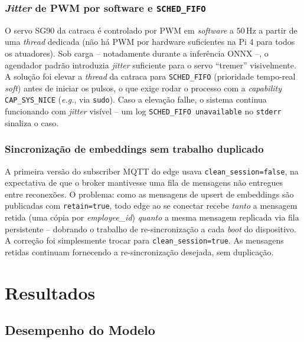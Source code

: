 \documentclass[12pt,a4paper]{report}
\begin{document}
\subsection{\textit{Jitter} de PWM por software e \texttt{SCHED\_FIFO}}

O servo SG90 da catraca é controlado por PWM em \textit{software} a
$50\,$Hz a partir de uma \textit{thread} dedicada (não há PWM por
hardware suficientes na Pi 4 para todos os atuadores). Sob carga --
notadamente durante a inferência ONNX --, o agendador padrão
introduzia \textit{jitter} suficiente para o servo ``tremer''
visivelmente. A solução foi elevar a \textit{thread} da catraca para
\texttt{SCHED\_FIFO} (prioridade tempo-real \textit{soft}) antes de
iniciar os pulsos, o que exige rodar o processo com a \textit{capability}
\texttt{CAP\_SYS\_NICE} (\textit{e.g.}, via \texttt{sudo}). Caso a
elevação falhe, o sistema continua funcionando com \textit{jitter}
visível -- um log \texttt{SCHED\_FIFO unavailable} no \texttt{stderr}
sinaliza o caso.

\subsection{Sincronização de embeddings sem trabalho duplicado}

A primeira versão do subscriber MQTT do edge usava
\texttt{clean\_session=false}, na expectativa de que o broker
mantivesse uma fila de mensagens não entregues entre reconexões. O
problema: como as mensagens de upsert de embeddings são publicadas
com \texttt{retain=true}, todo edge ao se conectar recebe \emph{tanto}
a mensagem retida (uma cópia por \textit{employee\_id}) \emph{quanto}
a mesma mensagem replicada via fila persistente -- dobrando o
trabalho de re-sincronização a cada \textit{boot} do dispositivo. A
correção foi simplesmente trocar para \texttt{clean\_session=true}.
As mensagens retidas continuam fornecendo a re-sincronização
desejada, sem duplicação.

\chapter{Resultados}
\label{cap:resultados}

\section{Desempenho do Modelo}
\label{sec:desempenho}
\end{document}
